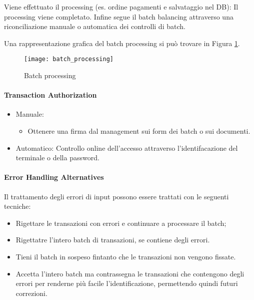 Viene effettuato il processing (es. ordine pagamenti e salvataggio nel DB):
Il processing viene completato.
Infine segue il batch balancing attraverso 
una riconciliazione manuale o automatica dei controlli di batch.

Una rappresentazione grafica del batch processing si può trovare in 
Figura \ref{fig:security:batch:processing}.
\begin{figure}[h!]
        \begin{center}
                \texttt{[image: batch\_processing]}
        \end{center}
        \caption{Batch processing}
        \label{fig:security:batch:processing}
\end{figure}

\paragraph{Transaction Authorization}
\begin{itemize}
	\item Manuale:
	\begin{itemize}
	\item Ottenere una firma dal management sui form dei batch o sui
	documenti.
	\end{itemize}
	\item Automatico:
	Controllo online dell'accesso attraverso l'identifacazione del
	terminale o della password.
\end{itemize}

\paragraph{Error Handling Alternatives}
Il trattamento degli errori di input possono essere trattati
con le seguenti tecniche:
\begin{itemize}
\item Rigettare le transazioni con errori e continuare a processare 
il batch;
\item Rigettatre l'intero batch di transazioni, se contiene
degli errori.
\item Tieni il batch in sospeso fintanto che le transazioni 
non vengono fissate.
\item Accetta l'intero batch ma contrassegna le transazioni che
contengono degli errori per renderne più facile l'identificazione,
permettendo quindi futuri correzioni.
\end{itemize}






